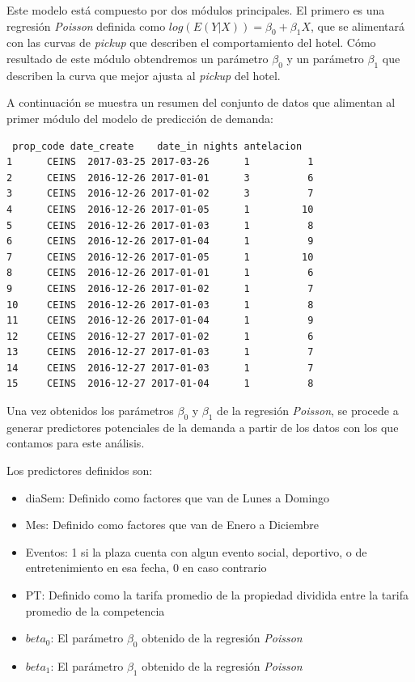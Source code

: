 Este modelo está compuesto por dos módulos principales. El primero es una regresión \emph{Poisson} definida como $log(E(Y|X)) = \beta_0 + \beta_1X$, que se alimentará con las curvas de \emph{pickup} que describen el comportamiento del hotel. Cómo resultado de este módulo obtendremos un parámetro $\beta_0$ y un parámetro $\beta_1$ que describen la curva que mejor ajusta al \emph{pickup} del hotel.

A continuación se muestra un resumen del conjunto de datos que alimentan al primer módulo del modelo de predicción de demanda:

\begin{verbatim}
 prop_code date_create    date_in nights antelacion
1      CEINS  2017-03-25 2017-03-26      1          1
2      CEINS  2016-12-26 2017-01-01      3          6
3      CEINS  2016-12-26 2017-01-02      3          7
4      CEINS  2016-12-26 2017-01-05      1         10
5      CEINS  2016-12-26 2017-01-03      1          8
6      CEINS  2016-12-26 2017-01-04      1          9
7      CEINS  2016-12-26 2017-01-05      1         10
8      CEINS  2016-12-26 2017-01-01      1          6
9      CEINS  2016-12-26 2017-01-02      1          7
10     CEINS  2016-12-26 2017-01-03      1          8
11     CEINS  2016-12-26 2017-01-04      1          9
12     CEINS  2016-12-27 2017-01-02      1          6
13     CEINS  2016-12-27 2017-01-03      1          7
14     CEINS  2016-12-27 2017-01-03      1          7
15     CEINS  2016-12-27 2017-01-04      1          8
\end{verbatim}

Una vez obtenidos los parámetros $\beta_0$ y $\beta_1$ de la regresión \emph{Poisson}, se procede a generar predictores potenciales de la demanda a partir de los datos con los que contamos para este análisis.

Los predictores definidos son:

\begin{itemize}
  \item diaSem: Definido como factores que van de Lunes a Domingo
  \item Mes: Definido como factores que van de Enero a Diciembre
  \item Eventos: 1 si la plaza cuenta con algun evento social, deportivo, o de entretenimiento en esa fecha, 0 en caso contrario
  \item PT: Definido como la tarifa promedio de la propiedad dividida entre la tarifa promedio de la competencia
  \item $beta_0$: El parámetro $\beta_0$ obtenido de la regresión \emph{Poisson}
  \item $beta_1$: El parámetro $\beta_1$ obtenido de la regresión \emph{Poisson}
\end{itemize}


